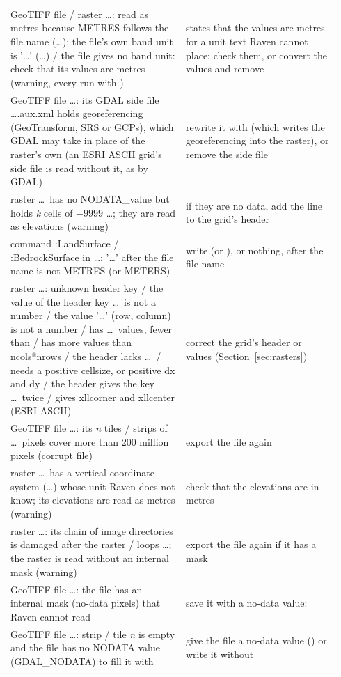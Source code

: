 \begin{longtable}{P{0.5\linewidth}P{0.44\linewidth}}
GeoTIFF file / raster \dots: read as metres because METRES follows the file name (\dots); the file's own band unit is '\dots' (\dots) / the file gives no band unit: check that its values are metres (warning, every run with ) &  states that the values are metres for a unit text Raven cannot place; check them, or convert the values and remove \\
GeoTIFF file \dots: its GDAL side file \dots.aux.xml holds georeferencing (GeoTransform, SRS or GCPs), which GDAL may take in place of the raster's own (an ESRI ASCII grid's side file is read without it, as by GDAL) & rewrite it with  (which writes the georeferencing into the raster), or remove the side file\\
raster \dots\ has no NODATA\_value but holds \emph{k} cells of $-9999$ \dots; they are read as elevations (warning) & if they are no data, add the line  to the grid's header\\
command :LandSurface / :BedrockSurface in \dots: '\dots' after the file name is not METRES (or METERS) & write  (or ), or nothing, after the file name\\
raster \dots: unknown header key / the value of the header key \dots\ is not a number / the value '\dots' (row, column) is not a number / has \dots\ values, fewer than / has more values than ncols*nrows / the header lacks \dots\ / needs a positive cellsize, or positive dx and dy / the header gives the key \dots\ twice / gives xllcorner and xllcenter (ESRI ASCII) & correct the grid's header or values (Section~\ref{sec:rasters})\\
GeoTIFF file \dots: its \emph{n} tiles / strips of \dots\ pixels cover more than 200 million pixels (corrupt file) & export the file again\\
raster \dots\ has a vertical coordinate system (\dots) whose unit Raven does not know; its elevations are read as metres (warning) & check that the elevations are in metres\\
raster \dots: its chain of image directories is damaged after the raster / loops \dots; the raster is read without an internal mask (warning) & export the file again if it has a mask\\
GeoTIFF file \dots: the file has an internal mask (no-data pixels) that Raven cannot read & save it with a no-data value: \\
GeoTIFF file \dots: strip / tile \emph{n} is empty and the file has no NODATA value (GDAL\_NODATA) to fill it with & give the file a no-data value () or write it without \\

\end{longtable}
